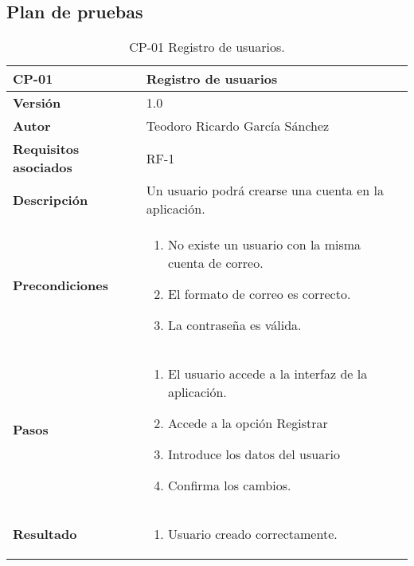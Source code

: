 \subsection{Plan de pruebas}

\begin{table}[p]
	\centering
	\begin{tabularx}{\linewidth}{ p{} p{} }
		\toprule
		\textbf{CP-01}    & \textbf{Registro de usuarios}\\
		\toprule
		\textbf{Versión}              & 1.0    \\
		\textbf{Autor}                & Teodoro Ricardo García Sánchez \\
		\textbf{Requisitos asociados} & RF-1 \\
		\textbf{Descripción}          & Un usuario podrá crearse una cuenta en la aplicación.\\
		\textbf{Precondiciones}         &  
		\begin{enumerate}
			\def\labelenumi{\arabic{enumi}.}
			\tightlist
			\item No existe un usuario con la misma cuenta de correo.
			\item El formato de correo es correcto.
			\item La contraseña es válida.
		\end{enumerate}\\
		\textbf{Pasos}             &
		\begin{enumerate}
			\def\labelenumi{\arabic{enumi}.}
			\tightlist
			\item El usuario accede a la interfaz de la aplicación.
			\item Accede a la opción Registrar
			\item Introduce los datos del usuario
			\item Confirma los cambios.
		\end{enumerate}\\
		\textbf{Resultado}          & 
		\begin{enumerate}
			\item Usuario creado correctamente.
		\end{enumerate}\\
		\bottomrule
	\end{tabularx}
	\caption{CP-01 Registro de usuarios.}
\end{table}

